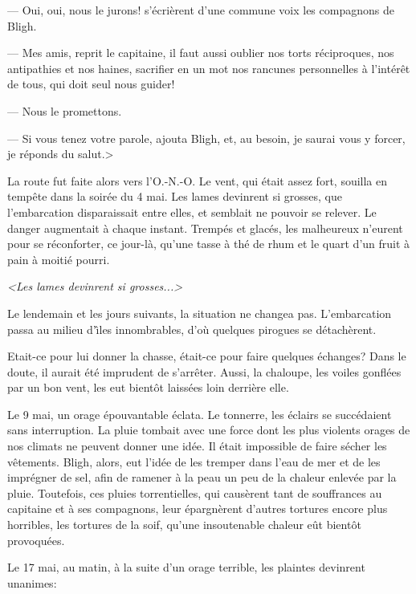 --- Oui, oui, nous le jurons! s'\'ecri\`erent
d'une commune voix les compagnons de Bligh.

--- Mes amis, reprit le capitaine, il faut aussi oublier
nos torts r\'eciproques, nos antipathies et nos haines,
sacrifier en un mot nos rancunes personnelles \`a
l'int\'er\^et de tous, qui doit seul nous guider!

--- Nous le promettons.

--- Si vous tenez votre parole, ajouta Bligh, et, au besoin,
je saurai vous y forcer, je r\'eponds du salut.>

La route fut faite alors vers l'O.-N.-O. Le vent,
qui \'etait assez fort, souilla en temp\^ete
dans la soir\'ee du 4 mai. Les lames devinrent
si grosses, que l'embarcation disparaissait entre elles,
et semblait ne pouvoir se relever. Le danger augmentait
\`a chaque instant. Tremp\'es et glac\'es,
les malheureux n'eurent pour se r\'econforter,
ce jour-l\`a, qu'une tasse \`a th\'e de rhum et
le quart d'un fruit \`a pain \`a moiti\'e pourri.

\pageinsert
\vskip 15cm
\centerline{}
\smallskip
\centerline{\it <Les lames devinrent si grosses...>}
\vfill
\endinsert

Le lendemain et les jours suivants, la situation
ne changea pas. L'embarcation passa au milieu
d'{\^\i}les innombrables, d'o\`u quelques
pirogues se d\'etach\`erent.

Etait-ce pour lui donner la chasse, \'etait-ce
pour faire quelques \'echanges? Dans le doute,
il aurait \'et\'e imprudent de s'arr\^eter.
Aussi, la chaloupe, les voiles gonfl\'ees par un bon vent,
les eut bient\^ot laiss\'ees loin derri\`ere elle.

Le 9 mai, un orage \'epouvantable \'eclata.
Le tonnerre, les \'eclairs se succ\'edaient
sans interruption. La pluie tombait avec une force
dont les plus violents orages de nos climats ne peuvent
donner une id\'ee. Il \'etait impossible
de faire s\'echer les v\^etements.
Bligh, alors, eut l'id\'ee de les tremper dans
l'eau de mer et de les impr\'egner de sel, afin
de ramener \`a la peau un peu de la chaleur
enlev\'ee par la pluie. Toutefois, ces pluies
torrentielles, qui caus\`erent tant de souffrances
au capitaine et \`a ses compagnons, leur
\'epargn\`erent d'autres tortures encore
plus horribles, les tortures de la soif, qu'une insoutenable
chaleur e\^ut bient\^ot provoqu\'ees.

Le 17 mai, au matin, \`a la suite d'un orage terrible,
les plaintes devinrent unanimes:

